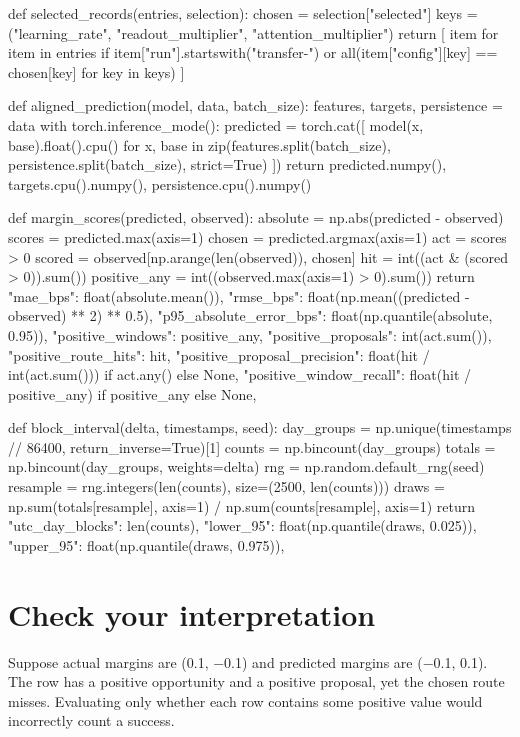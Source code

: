 \documentclass[11pt,oneside,openany]{book}
\begin{document}
\begin{BookCode}
def selected_records(entries, selection):
    chosen = selection["selected"]
    keys = ("learning_rate", "readout_multiplier", "attention_multiplier")
    return [
        item for item in entries if item["run"].startswith("transfer-") or
        all(item["config"][key] == chosen[key] for key in keys)
    ]
\end{BookCode}
\begin{BookCode}
def aligned_prediction(model, data, batch_size):
    features, targets, persistence = data
    with torch.inference_mode():
        predicted = torch.cat([
            model(x, base).float().cpu()
            for x, base in zip(features.split(batch_size), persistence.split(batch_size), strict=True)
        ])
    return predicted.numpy(), targets.cpu().numpy(), persistence.cpu().numpy()
\end{BookCode}
\begin{BookCode}
def margin_scores(predicted, observed):
    absolute = np.abs(predicted - observed)
    scores = predicted.max(axis=1)
    chosen = predicted.argmax(axis=1)
    act = scores > 0
    scored = observed[np.arange(len(observed)), chosen]
    hit = int((act & (scored > 0)).sum())
    positive_any = int((observed.max(axis=1) > 0).sum())
    return {
        "mae_bps": float(absolute.mean()),
        "rmse_bps": float(np.mean((predicted - observed) ** 2) ** 0.5),
        "p95_absolute_error_bps": float(np.quantile(absolute, 0.95)),
        "positive_windows": positive_any, "positive_proposals": int(act.sum()),
        "positive_route_hits": hit,
        "positive_proposal_precision": float(hit / int(act.sum())) if act.any() else None,
        "positive_window_recall": float(hit / positive_any) if positive_any else None,
    }
\end{BookCode}
\begin{BookCode}
def block_interval(delta, timestamps, seed):
    day_groups = np.unique(timestamps // 86400, return_inverse=True)[1]
    counts = np.bincount(day_groups)
    totals = np.bincount(day_groups, weights=delta)
    rng = np.random.default_rng(seed)
    resample = rng.integers(len(counts), size=(2500, len(counts)))
    draws = np.sum(totals[resample], axis=1) / np.sum(counts[resample], axis=1)
    return {
        "utc_day_blocks": len(counts),
        "lower_95": float(np.quantile(draws, 0.025)),
        "upper_95": float(np.quantile(draws, 0.975)),
    }
\end{BookCode}
\section*{Check your interpretation}
Suppose actual margins are (0.1, \ensuremath{-}0.1) and predicted margins are (\ensuremath{-}0.1, 0.1). The row has a positive opportunity and a positive proposal, yet the chosen route misses. Evaluating only whether each row contains some positive value would incorrectly count a success.
\end{document}
